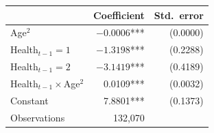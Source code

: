 \begin{tabular}{@{}l r r@{}}
\toprule
 & Coefficient & Std.\ error \\
\midrule
Age$^2$ & $-0.0006$*** & (0.0000) \\
Health$_{t-1}=1$ & $-1.3198$*** & (0.2288) \\
Health$_{t-1}=2$ & $-3.1419$*** & (0.4189) \\
Health$_{t-1}\times$Age$^2$ & 0.0109*** & (0.0032) \\
Constant & 7.8801*** & (0.1373) \\
\midrule
Observations & 132,070 & \\
\bottomrule
\end{tabular}
